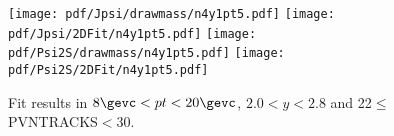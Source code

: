 \begin{figure}[H]
\begin{center}
\texttt{[image: pdf/Jpsi/drawmass/n4y1pt5.pdf]}
\texttt{[image: pdf/Jpsi/2DFit/n4y1pt5.pdf]}
\vspace*{-0.5cm}
\texttt{[image: pdf/Psi2S/drawmass/n4y1pt5.pdf]}
\texttt{[image: pdf/Psi2S/2DFit/n4y1pt5.pdf]}
\vspace*{-0.5cm}
\end{center}
\caption{Fit results in $8\gevc<pt<20\gevc$, $2.0<y<2.8$ and 22$\leq$PVNTRACKS$<$30.}
\label{Fitn4y1pt5}
\end{figure}
